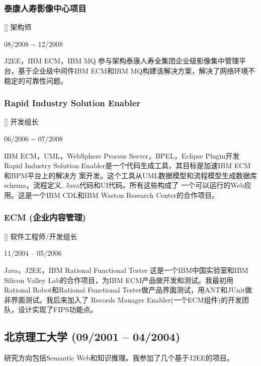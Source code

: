 \documentclass[a4paper]{article}
\newenvironment{DUlineblock}[1]{%
    \list{}{\setlength{\partopsep}{\parskip}
            \addtolength{\partopsep}{\baselineskip}
            \setlength{\topsep}{0pt}
            \setlength{\itemsep}{0.15\baselineskip}
            \setlength{\parsep}{0pt}
            \setlength{\leftmargin}{#1}}
    \raggedright
  }
  {\endlist}
\begin{document}
\begin{CJK}{UTF8}{gkai}
\subsubsection*{泰康人寿影像中心项目}
\begin{DUlineblock}{0em}
\item[] 架构师
\item[] 08/2008 -{}- 12/2008
\item[] J2EE，IBM ECM，IBM MQ
\end{DUlineblock}
参与架构泰康人寿全集团企业级影像集中管理平台，基于企业级中间件IBM ECM和IBM MQ构建该解决方案，解决了网络环境不稳定的可靠性问题。

\subsubsection*{Rapid Industry Solution Enabler}
\begin{DUlineblock}{0em}
\item[] 开发组长
\item[] 06/2006 -{}- 07/2008
\item[] IBM ECM，UML，WebSphere Process Server，BPEL，Eclipse Plugin开发
\end{DUlineblock}
Rapid Industry Solution Enabler是一个代码生成工具，其目标是加速IBM ECM和BPM平台上的解决方
案开发。这个工具从UML数据模型和流程模型生成数据库schema，流程定义, Java代码和UI代码。所有这些构成了
一个可以运行的Web应用。这是一个IBM CDL和IBM Waston Research Center的合作项目。

\subsubsection*{ECM (企业内容管理)}
\begin{DUlineblock}{0em}
\item[] 软件工程师/开发组长
\item[] 11/2004 – 05/2006
\item[] Java，J2EE，IBM Rational Functional Tester
\end{DUlineblock}
这是一个IBM中国实验室和IBM Silicon Valley Lab的合作项目，为IBM ECM产品做开发和测试。我最初用Rational
Robot和Rational Functional Tester做产品界面测试，用ANT和JUnit做非界面测试。我后来加入了
Records Manager Enabler(一个ECM组件)的开发团队，设计实现了FIPS功能点。

\subsection*{北京理工大学 (09/2001 – 04/2004)}
研究方向包括Semantic Web和知识推理。我参加了几个基于J2EE的项目。


\end{CJK}
\end{document}
